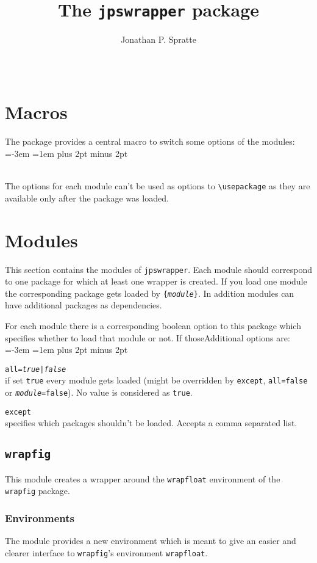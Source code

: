 \documentclass[a4paper,10pt]{scrartcl}
\title{The \texttt{jpswrapper} package}
\author{Jonathan P. Spratte}
\date{\jpswrapper@version\ \jpswrapper@date}
\newenvironment{codedescription}{%
  \parindent=-3em
  \parskip=1em plus 2pt minus 2pt
  \par
}{\par}
\newcommand*\optionTF{\textit{true}{\normalfont|}\textit{false}}
\begin{document}
\maketitle
\tableofcontents
\section{Macros}
The package provides a central macro to switch some options of the modules:
\begin{codedescription}
\texttt{\string{}}\\
  The options for each module can't be used as options to \verb|\usepackage| as
  they are available only after the package was loaded.
\end{codedescription}

\section{Modules}
This section contains the modules of \texttt{jpswrapper}. Each module should
correspond to one package for which at least one wrapper is created. If you
load one module the corresponding package gets loaded by
\texttt{\string\RequirePackage\{\textit{module}\}}. In addition modules can have
additional packages as dependencies.

For each module there is a corresponding boolean option to this package which
specifies whether to load that module or not. If thoseAdditional options are:
\begin{codedescription}
\texttt{all=\optionTF}\\
  if set \texttt{true} every module gets loaded (might be overridden by
  \texttt{except}, \texttt{all=false} or \texttt{\textit{module}=false}). No
  value is considered as \texttt{true}.

\texttt{except}\\
  specifies which packages shouldn't be loaded. Accepts a comma separated list.
\end{codedescription}

\subsection{\texttt{wrapfig}}
This module creates a wrapper around the \texttt{wrapfloat} environment of the
\texttt{wrapfig} package.

\subsubsection{Environments}
The module provides a new environment which is meant to give an easier and
clearer interface to \texttt{wrapfig}'s environment \texttt{wrapfloat}.
\end{document}
